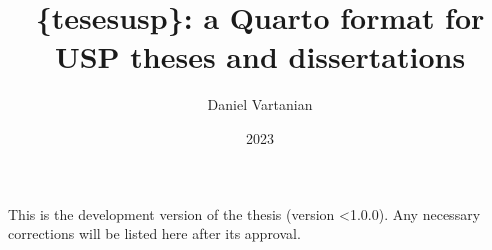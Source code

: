\documentclass[
  12pt,
  a4paper,
  oneside]{tesesusp}
\title{\{tesesusp\}: a Quarto format for USP theses and dissertations}
\author{Daniel Vartanian}
\date{2023}
\begin{document}
\maketitle


\frenchspacing



\clearpage



\imprimircapa


\imprimirfolhaderosto*


\begin{fichacatalografica}
 
\end{fichacatalografica}


\begin{errata}
This is the development version of the thesis (version \textless1.0.0).
Any necessary corrections will be listed here after its approval.
\end{errata}
\end{document}
